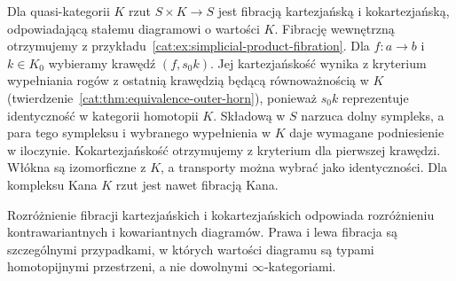 \begin{przyklad}\label{cat:ex:cartesian-constant-transport}
Dla quasi-kategorii $K$ rzut $S\times K\to S$ jest fibracją kartezjańską i kokartezjańską, odpowiadającą stałemu diagramowi o wartości $K$. Fibrację wewnętrzną otrzymujemy z przykładu~\ref{cat:ex:simplicial-product-fibration}. Dla $f:a\to b$ i $k\in K_0$ wybieramy krawędź $(f,s_0k)$. Jej kartezjańskość wynika z kryterium wypełniania rogów z ostatnią krawędzią będącą równoważnością w $K$ (twierdzenie~\ref{cat:thm:equivalence-outer-horn}), ponieważ $s_0k$ reprezentuje identyczność w kategorii homotopii $K$. Składową w $S$ narzuca dolny sympleks, a para tego sympleksu i wybranego wypełnienia w $K$ daje wymagane podniesienie w iloczynie. Kokartezjańskość otrzymujemy z kryterium dla pierwszej krawędzi. Włókna są izomorficzne z $K$, a transporty można wybrać jako identyczności. Dla kompleksu Kana $K$ rzut jest nawet fibracją Kana.
\end{przyklad}

Rozróżnienie fibracji kartezjańskich i kokartezjańskich odpowiada rozróżnieniu kontrawariantnych i kowariantnych diagramów. Prawa i lewa fibracja są szczególnymi przypadkami, w których wartości diagramu są typami homotopijnymi przestrzeni, a nie dowolnymi $\infty$-kategoriami.
